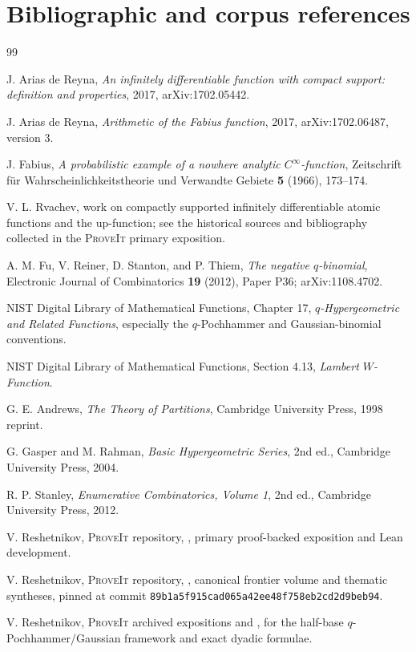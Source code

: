 \documentclass[11pt,oneside]{article}
\numberwithin{equation}{section}
\theoremstyle{definition}
\theoremstyle{remark}
\newcommand{\repo}{\textsc{ProveIt}}
\begin{document}
\section{Bibliographic and corpus references}
\label{app:bibliography}

\begin{thebibliography}{99}

J. Arias de Reyna,
\emph{An infinitely differentiable function with compact support: definition
and properties},
2017, arXiv:1702.05442.

J. Arias de Reyna,
\emph{Arithmetic of the Fabius function},
2017, arXiv:1702.06487, version 3.

J. Fabius,
\emph{A probabilistic example of a nowhere analytic $C^\infty$-function},
Zeitschrift f\"ur Wahrscheinlichkeitstheorie und Verwandte Gebiete
\textbf{5} (1966), 173--174.

V. L. Rvachev,
work on compactly supported infinitely differentiable atomic functions and the
up-function; see the historical sources and bibliography collected in the
\repo{} primary exposition.

A. M. Fu, V. Reiner, D. Stanton, and P. Thiem,
\emph{The negative $q$-binomial},
Electronic Journal of Combinatorics \textbf{19} (2012), Paper P36;
arXiv:1108.4702.

NIST Digital Library of Mathematical Functions,
Chapter 17, \emph{$q$-Hypergeometric and Related Functions}, especially the
$q$-Pochhammer and Gaussian-binomial conventions.

NIST Digital Library of Mathematical Functions,
Section 4.13, \emph{Lambert $W$-Function}.

G. E. Andrews,
\emph{The Theory of Partitions},
Cambridge University Press, 1998 reprint.

G. Gasper and M. Rahman,
\emph{Basic Hypergeometric Series}, 2nd ed.,
Cambridge University Press, 2004.

R. P. Stanley,
\emph{Enumerative Combinatorics, Volume 1}, 2nd ed.,
Cambridge University Press, 2012.

V. Reshetnikov,
\repo{} repository,
,
primary proof-backed exposition and Lean development.

V. Reshetnikov,
\repo{} repository,
,
canonical frontier volume and thematic syntheses, pinned at commit
\texttt{89b1a5f915cad065a42ee48f758eb2cd2d9beb94}.

V. Reshetnikov,
\repo{} archived expositions
 and
,
for the half-base $q$-Pochhammer/Gaussian framework and exact dyadic formulae.

\end{thebibliography}
\end{document}
